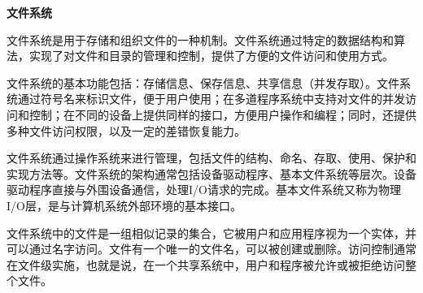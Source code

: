 \textbf{文件系统}

文件系统是用于存储和组织文件的一种机制。文件系统通过特定的数据结构和算法，实现了对文件和目录的管理和控制，提供了方便的文件访问和使用方式。

文件系统的基本功能包括：存储信息、保存信息、共享信息（并发存取）。文件系统通过符号名来标识文件，便于用户使用；在多道程序系统中支持对文件的并发访问和控制；在不同的设备上提供同样的接口，方便用户操作和编程；同时，还提供多种文件访问权限，以及一定的差错恢复能力。

文件系统通过操作系统来进行管理，包括文件的结构、命名、存取、使用、保护和实现方法等。文件系统的架构通常包括设备驱动程序、基本文件系统等层次。设备驱动程序直接与外围设备通信，处理I/O请求的完成。基本文件系统又称为物理I/O层，是与计算机系统外部环境的基本接口。

文件系统中的文件是一组相似记录的集合，它被用户和应用程序视为一个实体，并可以通过名字访问。文件有一个唯一的文件名，可以被创建或删除。访问控制通常在文件级实施，也就是说，在一个共享系统中，用户和程序被允许或被拒绝访问整个文件。

